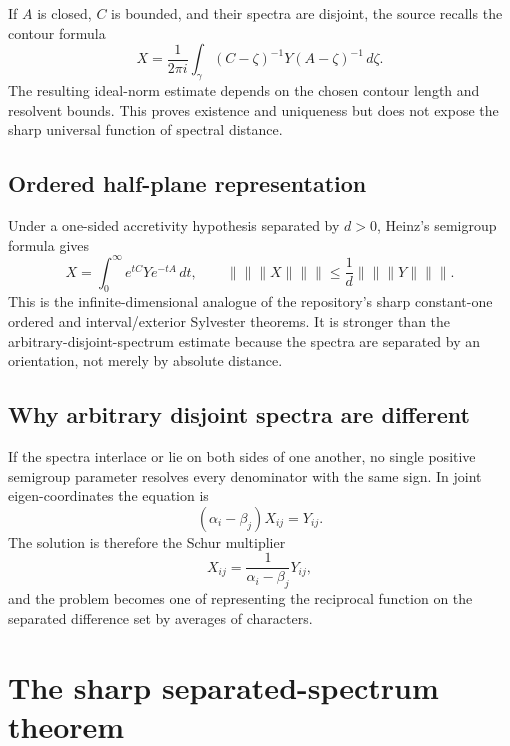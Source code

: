 
If $A$ is closed, $C$ is bounded, and their spectra are disjoint, the source recalls the contour formula
\[
  X=\frac{1}{2\pi i}\int_\gamma
      (C-\zeta)^{-1}Y(A-\zeta)^{-1}\,d\zeta.
\]
The resulting ideal-norm estimate depends on the chosen contour length and resolvent bounds. This proves existence and uniqueness but does not expose the sharp universal function of spectral distance.

\subsection{Ordered half-plane representation}


Under a one-sided accretivity hypothesis separated by $d>0$, Heinz's semigroup formula gives
\[
  X=\int_0^\infty e^{tC}Ye^{-tA}\,dt,
  \qquad
  \lVert\!\lVert\!\lVert X\rVert\!\rVert\!\rVert
  \le \frac1d\lVert\!\lVert\!\lVert Y\rVert\!\rVert\!\rVert.
\]
This is the infinite-dimensional analogue of the repository's sharp constant-one ordered and interval/exterior Sylvester theorems. It is stronger than the arbitrary-disjoint-spectrum estimate because the spectra are separated by an orientation, not merely by absolute distance.

\subsection{Why arbitrary disjoint spectra are different}

If the spectra interlace or lie on both sides of one another, no single positive semigroup parameter resolves every denominator with the same sign. In joint eigen-coordinates the equation is
\[
  (\alpha_i-\beta_j)X_{ij}=Y_{ij}.
\]
The solution is therefore the Schur multiplier
\[
  X_{ij}=\frac{1}{\alpha_i-\beta_j}Y_{ij},
\]
and the problem becomes one of representing the reciprocal function on the separated difference set by averages of characters.

\section{The sharp separated-spectrum theorem}


